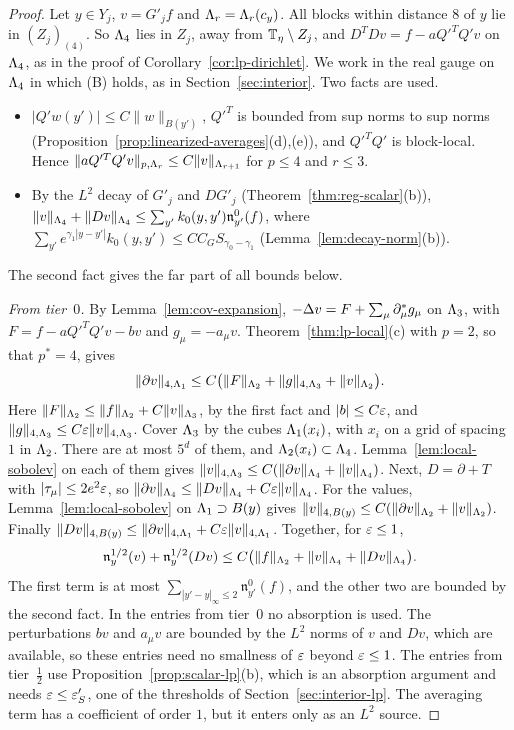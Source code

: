 \begin{proof}
Let $y\in Y_j$, $v=G'_jf$ and $\Lambda_r=\Lambda_r(c_y)$. All blocks within distance $8$ of $y$ lie in $(Z_j)_{(4)}$. So $\Lambda_4$ lies in $Z_j$, away from $\mathbb T_\eta\setminus Z_j$, and $D^TDv=f-aQ'^TQ'v$ on $\Lambda_4$, as in the proof of Corollary~\ref{cor:lp-dirichlet}. We work in the real gauge on $\Lambda_4$ in which (B) holds, as in Section~\ref{sec:interior}. Two facts are used.
\begin{itemize}
\item $|Q'w(y')|\le C\|w\|_{B(y')}$, $Q'^T$ is bounded from sup norms to sup norms (Proposition~\ref{prop:linearized-averages}(d),(e)), and $Q'^TQ'$ is block-local. Hence $\|aQ'^TQ'v\|_{p,\Lambda_r}\le C\|v\|_{\Lambda_{r+1}}$ for $p\le4$ and $r\le3$.
\item By the $L^2$ decay of $G'_j$ and $DG'_j$ (Theorem~\ref{thm:reg-scalar}(b)), $\|v\|_{\Lambda_4}+\|Dv\|_{\Lambda_4}\le\sum_{y'}k_0(y,y')\mathfrak n^0_{y'}(f)$, where $\sum_{y'}e^{\gamma_1|y-y'|}k_0(y,y')\le CC_GS_{\gamma_0-\gamma_1}$ (Lemma~\ref{lem:decay-norm}(b)).
\end{itemize}
The second fact gives the far part of all bounds below.

\emph{From tier~$0$.} By Lemma~\ref{lem:cov-expansion}, $-\Delta v=F+\sum_\mu\partial^*_\mu g_\mu$ on $\Lambda_3$, with $F=f-aQ'^TQ'v-bv$ and $g_\mu=-a_\mu v$. Theorem~\ref{thm:lp-local}(c) with $p=2$, so that $p^*=4$, gives
\[
\|\partial v\|_{4,\Lambda_1}\le C\big(\|F\|_{\Lambda_2}+\|g\|_{4,\Lambda_3}+\|v\|_{\Lambda_2}\big).
\]
Here $\|F\|_{\Lambda_2}\le\|f\|_{\Lambda_2}+C\|v\|_{\Lambda_3}$, by the first fact and $|b|\le C\varepsilon$, and $\|g\|_{4,\Lambda_3}\le C\varepsilon\|v\|_{4,\Lambda_3}$. Cover $\Lambda_3$ by the cubes $\Lambda_1(x_i)$, with $x_i$ on a grid of spacing $1$ in $\Lambda_2$. There are at most $5^d$ of them, and $\Lambda_2(x_i)\subset\Lambda_4$. Lemma~\ref{lem:local-sobolev} on each of them gives $\|v\|_{4,\Lambda_3}\le C(\|\partial v\|_{\Lambda_4}+\|v\|_{\Lambda_4})$. Next, $D=\partial+T$ with $|\tau_\mu|\le2e^2\varepsilon$, so $\|\partial v\|_{\Lambda_4}\le\|Dv\|_{\Lambda_4}+C\varepsilon\|v\|_{\Lambda_4}$. For the values, Lemma~\ref{lem:local-sobolev} on $\Lambda_1\supset B(y)$ gives $\|v\|_{4,B(y)}\le C(\|\partial v\|_{\Lambda_2}+\|v\|_{\Lambda_2})$. Finally $\|Dv\|_{4,B(y)}\le\|\partial v\|_{4,\Lambda_1}+C\varepsilon\|v\|_{4,\Lambda_1}$. Together, for $\varepsilon\le1$,
\[
\mathfrak n^{1/2}_y(v)+\mathfrak n^{1/2}_y(Dv)\le C\big(\|f\|_{\Lambda_2}+\|v\|_{\Lambda_4}+\|Dv\|_{\Lambda_4}\big).
\]
The first term is at most $\sum_{|y'-y|_\infty\le2}\mathfrak n^0_{y'}(f)$, and the other two are bounded by the second fact. In the entries from tier~$0$ no absorption is used. The perturbations $bv$ and $a_\mu v$ are bounded by the $L^2$ norms of $v$ and $Dv$, which are available, so these entries need no smallness of $\varepsilon$ beyond $\varepsilon\le1$. The entries from tier~$\frac12$ use Proposition~\ref{prop:scalar-lp}(b), which is an absorption argument and needs $\varepsilon\le\varepsilon'_S$, one of the thresholds of Section~\ref{sec:interior-lp}. The averaging term has a coefficient of order $1$, but it enters only as an $L^2$ source.


\end{proof}
